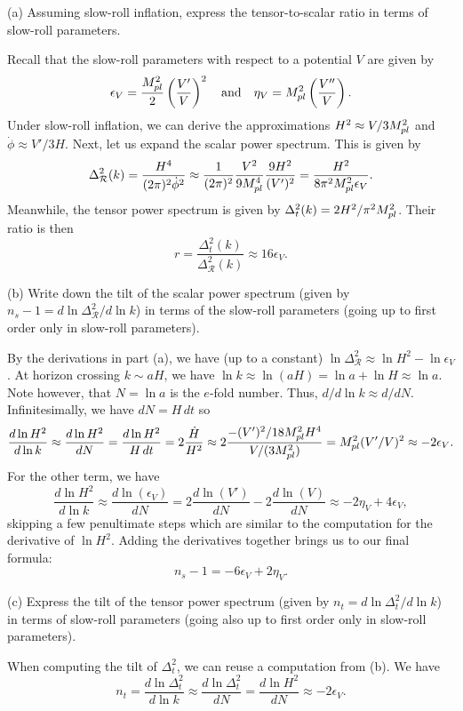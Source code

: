 \documentclass{lkx_pset}
\begin{document}
\pagebreak
\begin{problem}{2}
\end{problem}
\begin{parts}
  \begin{part}{(a)}
  Assuming slow-roll inflation, express the tensor-to-scalar ratio in terms of slow-roll parameters.
  \end{part}

  Recall that the slow-roll parameters with respect to a potential $V$ are given by
  \[
    \epsilon_V = \frac{M_{pl}^2}{2}\left(\frac{V'}{V}\right)^2
    \quad\textrm{and}\quad
    \eta_V = M_{pl}^2\left(\frac{V''}{V}\right).
  \]
  Under slow-roll inflation, we can derive the approximations $H^2 \approx V/3M_{pl}^2$ and $\dot{\phi}\approx V'/3H$. Next, let us expand the scalar power spectrum. This is given by
  \[
    \Delta_{\mathcal{R}}^2(k) = \frac{H^4}{(2\pi)^2 \dot{\phi}^2} \approx \frac{1}{(2\pi)^2}\frac{V^2}{ 9M_{pl}^4}\frac{9H^2}{(V')^2} = \frac{H^2}{8\pi^2M_{pl}^2 \epsilon_V}.
  \]
  Meanwhile, the tensor power spectrum is given by $\Delta_t^2(k)=2H^2/\pi^2M_{pl}^2$. Their ratio is then
  \[
    r = \frac{\Delta_t^2(k)}{\Delta^2_{\mathcal{R}}(k)} \approx 16\epsilon_V.
  \]

  \begin{part}{(b)}
    Write down the tilt of the scalar power spectrum (given by $n_s-1=d\ln \Delta_{\mathcal{R}}^2/d\ln k$) in terms of the slow-roll parameters (going up to first order only in slow-roll parameters).
  \end{part}

  By the derivations in part (a), we have (up to a constant) $\ln \Delta_{\mathcal{R}}^2 \approx  \ln H^2- \ln \epsilon_V$. At horizon crossing $k\sim aH$, we have $\ln k\approx \ln(aH) = \ln a + \ln H\approx \ln a$. Note however, that $N=\ln a$ is the $e$-fold number. Thus, $d/d\ln k\approx d/dN$. Infinitesimally, we have $dN = H\,dt$ so 
  \[
    \frac{d\ln H^2}{d\ln k} \approx \frac{d\ln H^2}{dN} = \frac{d\ln H^2}{H\,dt} = 2\frac{\dot{H}}{H^2} \approx 2\frac{-(V')^2/18M_{pl}^2H^4}{V/(3M_{pl}^2)} = M_{pl}^2(V'/V)^2\approx -2\epsilon_V.
  \]
  For the other term, we have
  \[
   \frac{d\ln H^2}{d\ln k}\approx \frac{d \ln(\epsilon_V)}{dN} = 2\frac{d\ln(V')}{dN} - 2\frac{d \ln(V)}{dN}\approx -2\eta_V + 4\epsilon_V,
  \]
  skipping a few penultimate steps which are similar to the computation for the derivative of  $\ln H^2$. Adding the derivatives together brings us to our final formula:
  \[
    n_s - 1 = -6\epsilon_V + 2\eta_V.
  \]

  \begin{part}{(c)}
    Express the tilt of the tensor power spectrum (given by $n_t = d\ln\Delta_t^2/d\ln k$) in terms of slow-roll parameters (going also up to first order only in slow-roll parameters). 
  \end{part}
  When computing the tilt of $\Delta_t^2$, we can reuse a computation from (b). We have
  \[
    n_t = \frac{d\ln\Delta_t^2}{d\ln k} \approx \frac{d\ln \Delta_t^2}{dN} = \frac{d\ln H^2}{dN} \approx -2\epsilon_V.
  \]


\end{parts}
\end{document}
